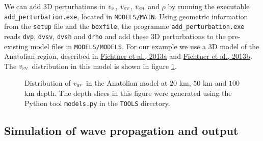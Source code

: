 We can add 3D perturbations in $v_\text{\tiny{P}}$, $v_\text{\tiny{SV}}$, $v_\text{\tiny{SH}}$ and $\rho$ by running the executable \texttt{add\_perturbation.exe}, located in \texttt{MODELS/MAIN}. Using geometric information from the \texttt{setup} file and the \texttt{boxfile}, the programme \texttt{add\_perturbation.exe} reads \texttt{dvp}, \texttt{dvsv}, \texttt{dvsh} and \texttt{drho} and add these 3D perturbations to the pre-existing model files in \texttt{MODELS/MODELS}. For our example we use a 3D model of the Anatolian region, described in \href{http://www.geo.uu.nl/~fichtner/papers/2013_Fichtner_EPSL.pdf} {Fichtner et al., 2013a} and \href{http://www.geo.uu.nl/~fichtner/papers/2013_Fichtner_GJI.pdf}{Fichtner et al., 2013b}. The $v_\text{\tiny{SV}}$ distribution in this model is shown in figure \ref{F:anatolia}. 
\begin{center}
\begin{figure}
\center{} 
\caption{Distribution of $v_\text{\tiny{SV}}$ in the Anatolian model at $20$ km, $50$ km and $100$ km depth. The depth slices in this figure were generated using the Python tool \texttt{models.py} in the \texttt{TOOLS} directory.}\label{F:anatolia}
\end{figure}
\end{center}


\subsection{Simulation of wave propagation and output}

